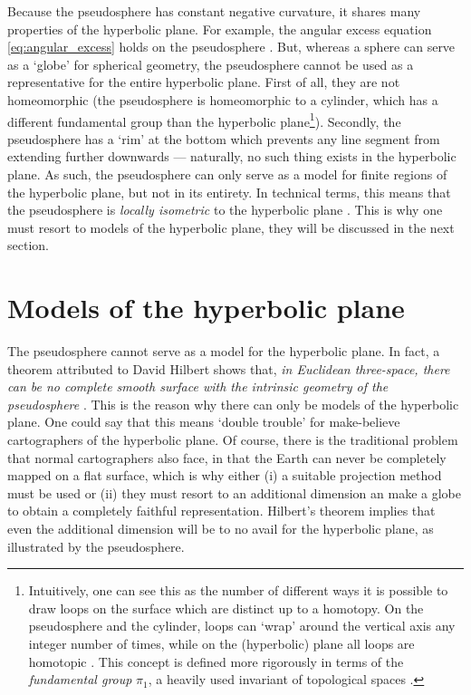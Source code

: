 Because the pseudosphere has constant negative curvature, it shares many properties of the hyperbolic plane. For example, the angular excess equation \cref{eq:angular_excess} holds on the pseudosphere \cite{Needham1997}. But, whereas a sphere can serve as a `globe' for spherical geometry, the pseudosphere cannot be used as a representative for the entire hyperbolic plane. First of all, they are not homeomorphic (the pseudosphere is homeomorphic to a cylinder, which has a different fundamental group than the hyperbolic plane\footnote{Intuitively, one can see this as the number of different ways it is possible to draw loops on the surface which are distinct up to a homotopy. On the pseudosphere and the cylinder, loops can `wrap' around the vertical axis any integer number of times, while on the (hyperbolic) plane all loops are homotopic \cite{Lee2000}. This concept is defined more rigorously in terms of the \emph{fundamental group} \(\pi_1\), a heavily used invariant of topological spaces \cite{Schuller2014}.}). Secondly, the pseudosphere has a `rim' at the bottom which prevents any line segment from extending further downwards --- naturally, no such thing exists in the hyperbolic plane. As such, the pseudosphere can only serve as a model for finite regions of the hyperbolic plane, but not in its entirety. In technical terms, this means that the pseudosphere is \emph{locally isometric} to the hyperbolic plane \cite{Ghys2010}. This is why one must resort to models of the hyperbolic plane, they will be discussed in the next section.

\section{Models of the hyperbolic plane}
The pseudosphere cannot serve as a model for the hyperbolic plane. In fact, a theorem attributed to David Hilbert shows that, \emph{in Euclidean three-space, there can be no complete smooth surface with the intrinsic geometry of the pseudosphere} \cite{Thurston1997}. This is the reason why there can only be models of the hyperbolic plane. One could say that this means `double trouble' for make-believe cartographers of the hyperbolic plane. Of course, there is the traditional problem that normal cartographers also face, in that the Earth can never be completely mapped on a flat surface, which is why either (i) a suitable projection method must be used or (ii) they must resort to an additional dimension an make a globe to obtain a completely faithful representation. Hilbert's theorem implies that even the additional dimension will be to no avail for the hyperbolic plane, as illustrated by the pseudosphere.

